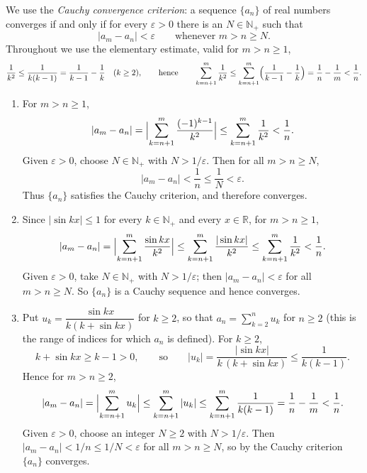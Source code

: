 \documentclass[11pt,a4paper]{article}
\newenvironment{solution}[1]{%
  \par\addvspace{1.7ex}%
  \noindent{\color{solutioncolor}\textbf{#1}}\hspace{0.55em}\ignorespaces}%
  {\par\addvspace{0.9ex}}
\begin{document}
\begin{solution}{Solution 2.3.13}\label{xs:2.3.13}
We use the \emph{Cauchy convergence criterion}: a sequence $\{a_n\}$ of real numbers converges if and only if for every $\varepsilon > 0$ there is an $N \in \mathbb{N}_+$ such that
\[
|a_m - a_n| < \varepsilon \qquad \text{whenever } m > n \ge N .
\]
Throughout we use the elementary estimate, valid for $m > n \ge 1$,
\[
\frac{1}{k^2} \le \frac{1}{k(k-1)} = \frac{1}{k-1} - \frac{1}{k} \quad (k \ge 2),
\qquad\text{hence}\qquad
\sum_{k=n+1}^{m} \frac{1}{k^2} \le \sum_{k=n+1}^{m}\Bigl(\frac{1}{k-1}-\frac{1}{k}\Bigr) = \frac{1}{n} - \frac{1}{m} < \frac{1}{n}.
\]
\begin{enumerate}[(1)]
  \item For $m > n \ge 1$,
  \[
  |a_m - a_n| = \Bigl|\sum_{k=n+1}^{m} \frac{(-1)^{k-1}}{k^2}\Bigr| \le \sum_{k=n+1}^{m}\frac{1}{k^2} < \frac{1}{n}.
  \]
  Given $\varepsilon > 0$, choose $N \in \mathbb{N}_+$ with $N > 1/\varepsilon$. Then for all $m > n \ge N$,
  \[
  |a_m - a_n| < \frac{1}{n} \le \frac{1}{N} < \varepsilon .
  \]
  Thus $\{a_n\}$ satisfies the Cauchy criterion, and therefore converges.
  \item Since $|\sin kx| \le 1$ for every $k \in \mathbb{N}_+$ and every $x \in \mathbb{R}$, for $m > n \ge 1$,
  \[
  |a_m - a_n| = \Bigl|\sum_{k=n+1}^{m} \frac{\sin kx}{k^2}\Bigr| \le \sum_{k=n+1}^{m}\frac{|\sin kx|}{k^2} \le \sum_{k=n+1}^{m}\frac{1}{k^2} < \frac{1}{n}.
  \]
  Given $\varepsilon > 0$, take $N \in \mathbb{N}_+$ with $N > 1/\varepsilon$; then $|a_m - a_n| < \varepsilon$ for all $m > n \ge N$. So $\{a_n\}$ is a Cauchy sequence and hence converges.
  \item Put $u_k = \dfrac{\sin kx}{k(k+\sin kx)}$ for $k \ge 2$, so that $a_n = \sum_{k=2}^{n} u_k$ for $n \ge 2$ (this is the range of indices for which $a_n$ is defined). For $k \ge 2$,
  \[
  k + \sin kx \ge k - 1 > 0,
  \qquad\text{so}\qquad
  |u_k| = \frac{|\sin kx|}{k\,(k+\sin kx)} \le \frac{1}{k(k-1)} .
  \]
  Hence for $m > n \ge 2$,
  \[
  |a_m - a_n| = \Bigl|\sum_{k=n+1}^{m} u_k\Bigr| \le \sum_{k=n+1}^{m}|u_k| \le \sum_{k=n+1}^{m}\frac{1}{k(k-1)} = \frac{1}{n} - \frac{1}{m} < \frac{1}{n}.
  \]
  Given $\varepsilon > 0$, choose an integer $N \ge 2$ with $N > 1/\varepsilon$. Then $|a_m - a_n| < 1/n \le 1/N < \varepsilon$ for all $m > n \ge N$, so by the Cauchy criterion $\{a_n\}$ converges.
\end{enumerate}
\end{solution}
\end{document}
